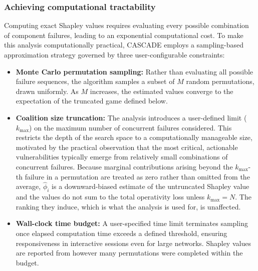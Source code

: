 \documentclass[review,12pt]{elsarticle}
\begin{document}
\subsubsection{Achieving computational tractability}
\label{subsubsec:shapley_approx}
Computing exact Shapley values requires evaluating every possible combination of component failures, leading to an exponential computational cost. To make this analysis computationally practical, CASCADE employs a sampling-based approximation strategy governed by three user-configurable constraints:
\begin{itemize}
  \item \textbf{Monte Carlo permutation sampling:} Rather than evaluating all possible failure sequences, the algorithm samples a subset of $M$ random permutations, drawn uniformly. As $M$ increases, the estimated values converge to the expectation of the truncated game defined below.
  \item \textbf{Coalition size truncation:} The analysis introduces a user-defined limit ($k_{\max}$) on the maximum number of concurrent failures considered. This restricts the depth of the search space to a computationally manageable size, motivated by the practical observation that the most critical, actionable vulnerabilities typically emerge from relatively small combinations of concurrent failures. Because marginal contributions arising beyond the $k_{\max}$-th failure in a permutation are treated as zero rather than omitted from the average, $\hat{\phi}_i$ is a downward-biased estimate of the untruncated Shapley value and the values do not sum to the total operativity loss unless $k_{\max}=N$. The ranking they induce, which is what the analysis is used for, is unaffected.
  \item \textbf{Wall-clock time budget:} A user-specified time limit
    terminates sampling once elapsed computation time exceeds a defined threshold, ensuring responsiveness in interactive sessions even for large networks. Shapley values are reported from however many permutations were completed within the budget.
\end{itemize}
\end{document}
